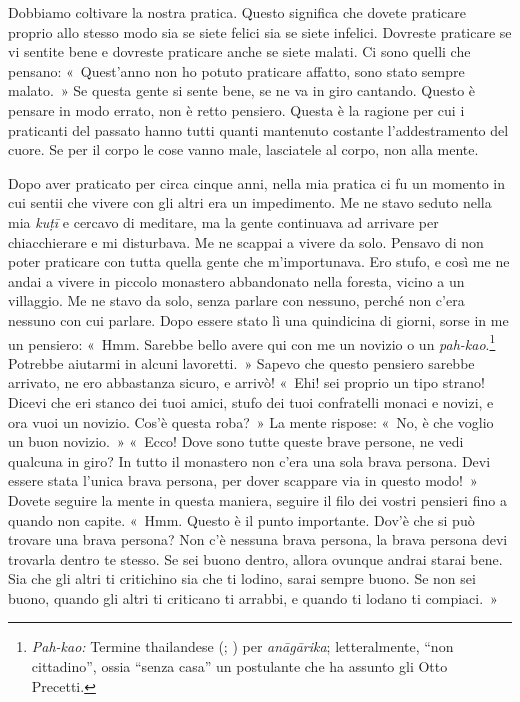 Dobbiamo coltivare la nostra pratica. Questo significa che dovete
praticare proprio allo stesso modo sia se siete felici sia se siete
infelici. Dovreste praticare se vi sentite bene e dovreste praticare
anche se siete malati. Ci sono quelli che pensano: «~Quest'anno non ho
potuto praticare affatto, sono stato sempre malato.~» Se questa gente si
sente bene, se ne va in giro cantando. Questo è pensare in modo errato,
non è retto pensiero. Questa è la ragione per cui i praticanti del
passato hanno tutti quanti mantenuto costante l'addestramento del cuore.
Se per il corpo le cose vanno male, lasciatele al corpo, non alla mente.

Dopo aver praticato per circa cinque anni, nella mia pratica ci fu un
momento in cui sentii che vivere con gli altri era un impedimento. Me ne
stavo seduto nella mia \emph{kuṭī} e cercavo di meditare, ma la gente
continuava ad arrivare per chiacchierare e mi disturbava. Me ne scappai
a vivere da solo. Pensavo di non poter praticare con tutta quella gente
che m'importunava. Ero stufo, e così me ne andai a vivere in piccolo
monastero abbandonato nella foresta, vicino a un villaggio. Me ne stavo
da solo, senza parlare con nessuno, perché non c'era nessuno con cui
parlare. Dopo essere stato lì una quindicina di giorni, sorse in me un
pensiero: «~Hmm. Sarebbe bello avere qui con me un novizio o un
\emph{pah-kao}.\footnote{\emph{Pah-kao:} Termine thailandese (;
  ) per \emph{anāgārika}; letteralmente, ``non cittadino'', ossia
  ``senza casa'' un postulante che ha assunto gli Otto Precetti.}
Potrebbe aiutarmi in alcuni lavoretti.~» Sapevo che questo pensiero
sarebbe arrivato, ne ero abbastanza sicuro, e arrivò! «~Ehi! sei proprio
un tipo strano! Dicevi che eri stanco dei tuoi amici, stufo dei tuoi
confratelli monaci e novizi, e ora vuoi un novizio. Cos'è questa roba?~»
La mente rispose: «~No, è che voglio un buon novizio.~» «~Ecco! Dove
sono tutte queste brave persone, ne vedi qualcuna in giro? In tutto il
monastero non c'era una sola brava persona. Devi essere stata l'unica
brava persona, per dover scappare via in questo modo!~» Dovete seguire
la mente in questa maniera, seguire il filo dei vostri pensieri fino a
quando non capite. «~Hmm. Questo è il punto importante. Dov'è che si può
trovare una brava persona? Non c'è nessuna brava persona, la brava
persona devi trovarla dentro te stesso. Se sei buono dentro, allora
ovunque andrai starai bene. Sia che gli altri ti critichino sia che ti
lodino, sarai sempre buono. Se non sei buono, quando gli altri ti
criticano ti arrabbi, e quando ti lodano ti compiaci.~»

